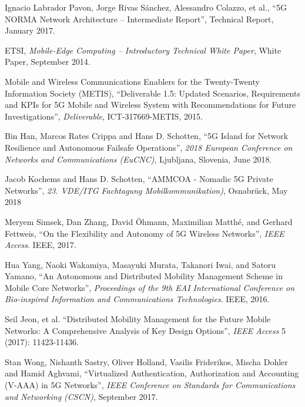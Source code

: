 \documentclass{ieeeaccess}
\begin{document}
\begin{thebibliography}{1}
		Ignacio Labrador Pavon, Jorge Rivas S\'anchez, Alessandro Colazzo, et al., ``5G NORMA Network Architecture -- Intermediate Report'', Technical Report, January 2017.
		
		ETSI, \emph{Mobile-Edge Computing -- Introductory Technical White Paper}, White Paper, September 2014.
		
		
		Mobile and Wireless Communications Enablers for the Twenty-Twenty Information Society (METIS), ``Deliverable 1.5: Updated Scenarios, Requirements and KPIs for 5G Mobile and Wireless System with Recommendations for Future Investigations'', \emph{ Deliverable}, ICT-317669-METIS, 2015.
		
		Bin Han, Marcos Rates Crippa and Hans D. Schotten, ``5G Island for Network Resilience and Autonomous Failsafe Operations'', \emph{2018 European Conference on Networks and Communications (EuCNC)}, Ljubljana, Slovenia, June 2018.
		
		Jacob Kochems and Hans D. Schotten, ``AMMCOA - Nomadic 5G Private Networks'', \emph{23. VDE/ITG Fachtagung Mobilkommunikation)}, Osnabrück, May 2018
		
		Meryem Simsek, Dan Zhang, David {\"O}hmann, Maximilian Matth{\'e}, and Gerhard Fettweis, ``On the Flexibility and Autonomy of 5G Wireless Networks'', \emph{IEEE Access}. IEEE, 2017.
		
		Hua Yang, Naoki Wakamiya, Masayuki Murata, Takanori Iwai, and Satoru Yamano, ``An Autonomous and Distributed Mobility Management Scheme in Mobile Core Networks'', \emph{Proceedings of the 9th EAI International Conference on Bio-inspired Information and Communications Technologies}. IEEE, 2016.
		
		Seil Jeon, et al. ``Distributed Mobility Management for the Future Mobile Networks: A Comprehensive Analysis of Key Design Options'', \emph{IEEE Access} 5 (2017): 11423-11436.
		
		Stan Wong, Nishanth Sastry, Oliver Holland, Vasilis Friderikos, Mischa Dohler and Hamid Aghvami, ``Virtualized Authentication, Authorization and Accounting (V-AAA) in 5G Networks'', \emph{IEEE Conference on Standards for Communications and Networking (CSCN)}, September 2017.
		

\end{thebibliography}
\end{document}
